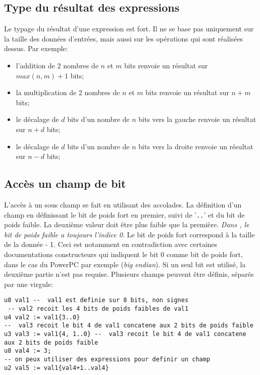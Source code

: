 
\subsection{Type du résultat des expressions}
\label{sec:typeExp}
Le typage du résultat d'une expression est fort. Il ne se base pas uniquement sur la taille des données d'entrées, mais aussi sur les opérations qui sont réalisées dessus. Par exemple: 
\begin{itemize}
\item l'addition de 2 nombres de $n$ et $m$ bits renvoie un résultat sur $max(n,m)+1$ bits;
\item la multiplication de 2 nombres de $n$ et $m$ bits renvoie un résultat sur $n+m$ bits;
\item le décalage de $d$ bits d'un nombre de $n$ bits vers la gauche renvoie un résultat sur $n+d$ bits;
\item le décalage de $d$ bits d'un nombre de $n$ bits vers la droite renvoie un résultat sur $n-d$ bits;
\end{itemize}

\subsection{Accès un champ de bit}
\label{sec:field}
L'accès à un sous champ se fait en utilisant des accolades. La définition d'un champ en définissant le bit de poids fort en premier, suivi de '\texttt{..}' et du bit de poids faible. La deuxième valeur doit être plus faible que la première.
\emph{Dans \harmless, le bit de poids faible a toujours l'indice 0}. Le bit de poids fort correspond à la taille de la donnée - 1. Ceci est notamment en contradiction avec certaines documentations constructeurs qui indiquent le bit 0 comme bit de poids fort, dans le cas du PowerPC par exemple (\emph{big endian}).
Si un seul bit est utilisé, la deuxième partie n'est pas requise. Plusieurs champs peuvent être définis, séparés par une virgule:
\begin{lstlisting}
u8 val1 --  val1 est definie sur 8 bits, non signes
 -- val2 recoit les 4 bits de poids faibles de val1
u4 val2 := val1{3..0}
--  val3 recoit le bit 4 de val1 concatene aux 2 bits de poids faible
u3 val3 := val1{4, 1..0} --  val3 recoit le bit 4 de val1 concatene aux 2 bits de poids faible
u8 val4 := 3;
-- on peux utiliser des expressions pour definir un champ
u2 val5 := val1{val4+1..val4}
\end{lstlisting}

